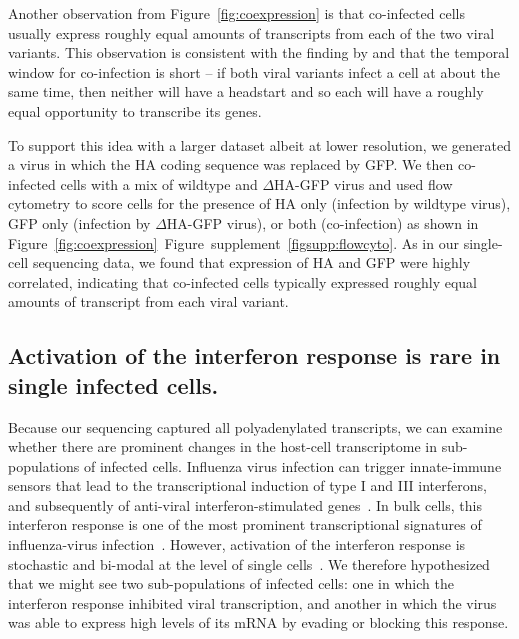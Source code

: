 \documentclass[9pt,lineno]{elife}
\begin{document}
Another observation from Figure~\ref{fig:coexpression} is that co-infected cells usually express roughly equal amounts of transcripts from each of the two viral variants.
This observation is consistent with the finding by \citet{Dou:2017cp} and \citet{Huang:2008gy} that the temporal window for co-infection is short -- if both viral variants infect a cell at about the same time, then neither will have a headstart and so each will have a roughly equal opportunity to transcribe its genes.

To support this idea with a larger dataset albeit at lower resolution, we generated a virus in which the HA coding sequence was replaced by GFP.
We then co-infected cells with a mix of wildtype and $\Delta$HA-GFP virus and used flow cytometry to score cells for the presence of HA only (infection by wildtype virus), GFP only (infection by $\Delta$HA-GFP virus), or both (co-infection) as shown in Figure~\ref{fig:coexpression}~Figure~supplement~\ref{figsupp:flowcyto}.
As in our single-cell sequencing data, we found that expression of HA and GFP were highly correlated, indicating that co-infected cells typically expressed roughly equal amounts of transcript from each viral variant.

\subsection{Activation of the interferon response is rare in single infected cells.}
Because our sequencing captured all polyadenylated transcripts, we can examine whether there are prominent changes in the host-cell transcriptome in sub-populations of infected cells.
Influenza virus infection can trigger innate-immune sensors that lead to the transcriptional induction of type I and III interferons, and subsequently of anti-viral interferon-stimulated genes~\citep{Killip:2015dw,Iwasaki:2014dw,Crotta:2013ef}.
In bulk cells, this interferon response is one of the most prominent transcriptional signatures of influenza-virus infection~\citep{Geiss:2002a}.
However, activation of the interferon response is stochastic and bi-modal at the level of single cells~\citep{Chen:2010cr,Shalek:2014ey,Shalek:2013ej,PerezCidoncha:2014jr,bhushal2017cell}.
We therefore hypothesized that we might see two sub-populations of infected cells: one in which the interferon response inhibited viral transcription, and another in which the virus was able to express high levels of its mRNA by evading or blocking this response.
\end{document}
